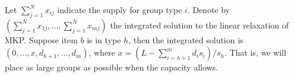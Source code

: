 Let $\sum_{j=1}^{N} x_{ij}$ indicate the supply for group type $i$. Denote by $(\sum_{j=1}^{N} x_{1j},\ldots, \sum_{j=1}^{N} x_{mj})$ the integrated solution to the linear relaxation of MKP.
Suppose item $b$ is in type $h$, then the integrated solution is $(0,\ldots, x,d_{h+1}, \ldots, d_{m})$, where $x = (L- \sum_{i = h+1}^{m} {d_i s_i})/ s_h$. That is, we will place as large groups as possible when the capacity allows.








